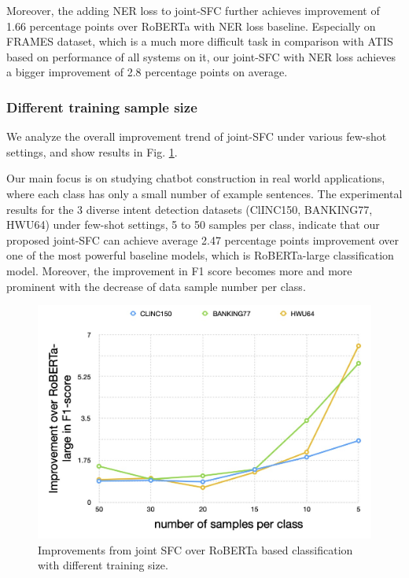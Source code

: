 Moreover, the adding NER loss to joint-SFC further achieves improvement of 1.66 percentage points over RoBERTa with NER loss baseline. 
Especially on FRAMES dataset, which is a much more difficult task in comparison with ATIS based on performance of all systems on it, our joint-SFC with NER loss achieves a bigger improvement of 2.8 percentage points on average. 

\subsubsection*{Different training sample size} 
We analyze the overall improvement trend of joint-SFC under various few-shot settings, and show results in Fig. \ref{fig:trend}.

Our main focus is on studying chatbot construction in real world applications, where each class has only a small number of example sentences.
The experimental results for the 3 diverse intent detection datasets (ClINC150, BANKING77, HWU64) under few-shot settings, 5 to 50 samples per class, indicate that our proposed joint-SFC can achieve average 2.47 percentage points improvement over one of the most powerful baseline models, which is RoBERTa-large classification model. 
Moreover, the improvement in F1 score becomes more and more prominent with the decrease of data sample number per class.

\begin{figure}[t]
  \begin{centering}
    \includegraphics[scale=0.2]{picture/improvement_trend.jpg} 
    \par
  \end{centering}
  \caption{
    Improvements from joint SFC over RoBERTa based classification with different training size.
  }
  \label{fig:trend}
\end{figure}

